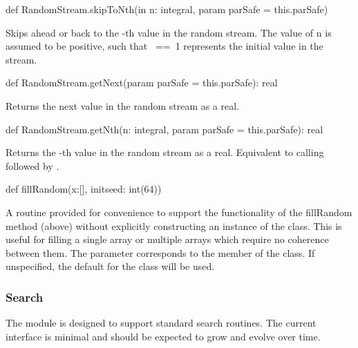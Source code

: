 \begin{protohead}
def RandomStream.skipToNth(in n: integral, param parSafe = this.parSafe)
\end{protohead}
\begin{protobody}
Skips ahead or back to the -th value in the
random stream.  The value of n is assumed to be positive, such that
~==~1 represents the initial value in the stream.
\end{protobody}

\begin{protohead}
def RandomStream.getNext(param parSafe = this.parSafe): real
\end{protohead}
\begin{protobody}
Returns the next value in the random stream as a real.
\end{protobody}

\begin{protohead}
def RandomStream.getNth(n: integral, param parSafe = this.parSafe): real
\end{protohead}
\begin{protobody}
Returns the -th value in the random stream as a real.  Equivalent to
calling  followed by .
\end{protobody}

\begin{protohead}
def fillRandom(x:[], initseed: int(64))
\end{protohead}
\begin{protobody}
A routine provided for convenience to support the functionality of the
fillRandom method (above) without explicitly constructing an instance
of the  class.  This is useful for filling a single
array or multiple arrays which require no coherence between them.
The  parameter corresponds to the  member of
the  class.  If unspecified, the default for the
class will be used.
\end{protobody}

\subsubsection{Search}
\label{Search}

The  module is designed to support standard search
routines.  The current interface is minimal and should be expected to
grow and evolve over time.


